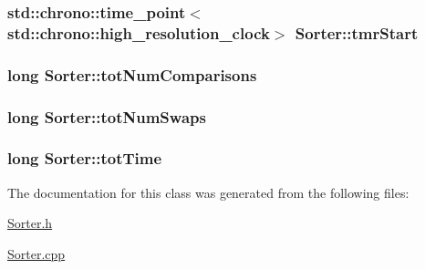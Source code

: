 \subsubsection[{\texorpdfstring{tmr\+Start}{tmrStart}}]{\setlength{\rightskip}{0pt plus 5cm}std\+::chrono\+::time\+\_\+point$<$std\+::chrono\+::high\+\_\+resolution\+\_\+clock$>$ Sorter\+::tmr\+Start\hspace{0.3cm}{\ttfamily [protected]}}\hypertarget{class_sorter_a022bf8dfe39ec74d4761fe9c9b0f5915}{}\label{class_sorter_a022bf8dfe39ec74d4761fe9c9b0f5915}
\subsubsection[{\texorpdfstring{tot\+Num\+Comparisons}{totNumComparisons}}]{\setlength{\rightskip}{0pt plus 5cm}long Sorter\+::tot\+Num\+Comparisons\hspace{0.3cm}{\ttfamily [protected]}}\hypertarget{class_sorter_a28ba087dad25b8c837c1211d8d2cb8f4}{}\label{class_sorter_a28ba087dad25b8c837c1211d8d2cb8f4}
\subsubsection[{\texorpdfstring{tot\+Num\+Swaps}{totNumSwaps}}]{\setlength{\rightskip}{0pt plus 5cm}long Sorter\+::tot\+Num\+Swaps\hspace{0.3cm}{\ttfamily [protected]}}\hypertarget{class_sorter_a2fcaa452c03ec3429bedd8de1421e678}{}\label{class_sorter_a2fcaa452c03ec3429bedd8de1421e678}
\subsubsection[{\texorpdfstring{tot\+Time}{totTime}}]{\setlength{\rightskip}{0pt plus 5cm}long Sorter\+::tot\+Time\hspace{0.3cm}{\ttfamily [protected]}}\hypertarget{class_sorter_afd76a62edf3a0f6ed7a2eee28335e42f}{}\label{class_sorter_afd76a62edf3a0f6ed7a2eee28335e42f}


The documentation for this class was generated from the following files\+:\begin{DoxyCompactItemize}
\item 
\hyperlink{_sorter_8h}{Sorter.\+h}\item 
\hyperlink{_sorter_8cpp}{Sorter.\+cpp}\end{DoxyCompactItemize}
